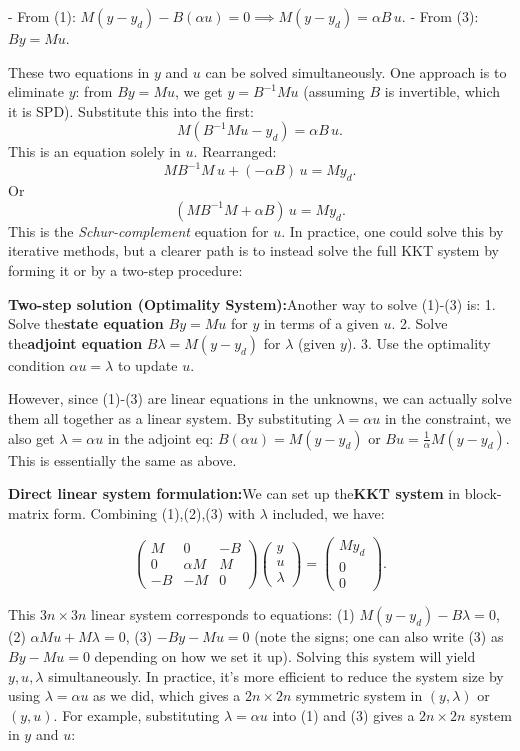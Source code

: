 \documentclass[a4paper,10pt]{article}
\begin{document}
- From (1): \(M(y - y_d) - B(\alpha u) = 0 \implies M(y - y_d) = \alpha B\,u\).
- From (3): \(B y = M u\).

These two equations in \(y\) and \(u\) can be solved simultaneously. One approach is to eliminate \(y\): from \(B y = M u\), we get \(y = B^{-1} M u\) (assuming \(B\) is invertible, which it is SPD). Substitute this into the first:
\[M(B^{-1} M u - y_d) = \alpha B\, u.\]
This is an equation solely in \(u\). Rearranged:
\[M B^{-1} M\, u + (-\alpha B)\, u = M y_d.\]
Or
\[(M B^{-1} M + \alpha B)\, u = M y_d.\]
This is the \emph{Schur-complement} equation for \(u\). In practice, one could solve this by iterative methods, but a clearer path is to instead solve the full KKT system by forming it or by a two-step procedure:

\textbf{Two-step solution (Optimality System):}Another way to solve (1)-(3) is:
1. Solve the\textbf{state equation} \(B y = M u\) for \(y\) in terms of a given \(u\).
2. Solve the\textbf{adjoint equation} \(B \lambda = M(y - y_d)\) for \(\lambda\) (given \(y\)).
3. Use the optimality condition \(\alpha u = \lambda\) to update \(u\).

However, since (1)-(3) are linear equations in the unknowns, we can actually solve them all together as a linear system. By substituting \(\lambda=\alpha u\) in the constraint, we also get \(\lambda = \alpha u\) in the adjoint eq: \(B(\alpha u) = M(y - y_d)\) or \(B u = \frac{1}{\alpha}M(y - y_d)\). This is essentially the same as above.

\textbf{Direct linear system formulation:}We can set up the\textbf{KKT system} in block-matrix form. Combining (1),(2),(3) with \(\lambda\) included, we have:

\[
	\begin{pmatrix}
		M  & 0        & -B \\
		0  & \alpha M & M  \\
		-B & -M       & 0
	\end{pmatrix}
	\begin{pmatrix} y \\ u \\ \lambda \end{pmatrix}
	=
	\begin{pmatrix} M y_d \\ 0 \\ 0 \end{pmatrix}.
\]

This \(3n \times 3n\) linear system corresponds to equations:
(1) \(M(y - y_d) - B\lambda = 0\),
(2) \(\alpha M u + M \lambda = 0\),
(3) \(-B y - M u = 0\) (note the signs; one can also write (3) as \(B y - M u = 0\) depending on how we set it up). Solving this system will yield \(y, u, \lambda\) simultaneously.
In practice, it's more efficient to reduce the system size by using \(\lambda = \alpha u\) as we did, which gives a \(2n \times 2n\) symmetric system in \((y,\lambda)\) or \((y,u)\). For example, substituting \(\lambda=\alpha u\) into (1) and (3) gives a \(2n\times 2n\) system in \(y\) and \(u\):
\end{document}
